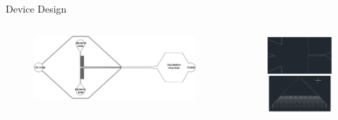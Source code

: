 \documentclass{beamer}
\begin{document}
\begin{frame}{Device Design}
\begin{columns}[c] %
\begin{figure}
\includegraphics[width=1\linewidth]{images/chip-design.png}
\end{figure}
\begin{figure}
\includegraphics[width=1\linewidth]{images/neck-and-filters.png}
\end{figure}
\end{columns}
\end{frame}
\end{document}

